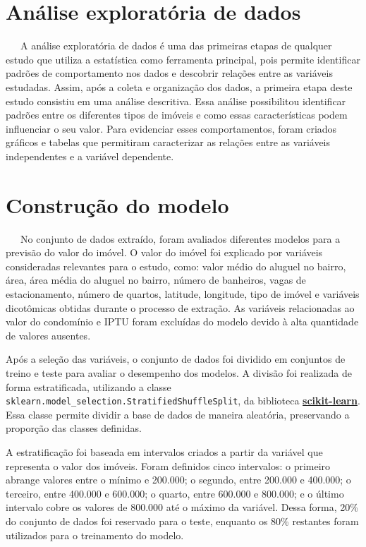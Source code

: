 \documentclass[
  12pt,
  a4paper,
]{scrreprt}
\begin{document}
\section{Análise exploratória de
dados}\label{anuxe1lise-exploratuxf3ria-de-dados}

~~~A análise exploratória de dados é uma das primeiras etapas de
qualquer estudo que utiliza a estatística como ferramenta principal,
pois permite identificar padrões de comportamento nos dados e descobrir
relações entre as variáveis estudadas. Assim, após a coleta e
organização dos dados, a primeira etapa deste estudo consistiu em uma
análise descritiva. Essa análise possibilitou identificar padrões entre
os diferentes tipos de imóveis e como essas características podem
influenciar o seu valor. Para evidenciar esses comportamentos, foram
criados gráficos e tabelas que permitiram caracterizar as relações entre
as variáveis independentes e a variável dependente.

\section{Construção do modelo}\label{construuxe7uxe3o-do-modelo}

~~~No conjunto de dados extraído, foram avaliados diferentes modelos
para a previsão do valor do imóvel. O valor do imóvel foi explicado por
variáveis consideradas relevantes para o estudo, como: valor médio do
aluguel no bairro, área, área média do aluguel no bairro, número de
banheiros, vagas de estacionamento, número de quartos, latitude,
longitude, tipo de imóvel e variáveis dicotômicas obtidas durante o
processo de extração. As variáveis relacionadas ao valor do condomínio e
IPTU foram excluídas do modelo devido à alta quantidade de valores
ausentes.

\vspace{12pt}

Após a seleção das variáveis, o conjunto de dados foi dividido em
conjuntos de treino e teste para avaliar o desempenho dos modelos. A
divisão foi realizada de forma estratificada, utilizando a classe
\texttt{sklearn.model\_selection.StratifiedShuffleSplit}, da biblioteca
\href{https://scikit-learn.org/stable/}{\textbf{scikit-learn}}. Essa
classe permite dividir a base de dados de maneira aleatória, preservando
a proporção das classes definidas.

\vspace{12pt}

A estratificação foi baseada em intervalos criados a partir da variável
que representa o valor dos imóveis. Foram definidos cinco intervalos: o
primeiro abrange valores entre o mínimo e 200.000; o segundo, entre
200.000 e 400.000; o terceiro, entre 400.000 e 600.000; o quarto, entre
600.000 e 800.000; e o último intervalo cobre os valores de 800.000 até
o máximo da variável. Dessa forma, 20\% do conjunto de dados foi
reservado para o teste, enquanto os 80\% restantes foram utilizados para
o treinamento do modelo.
\end{document}

